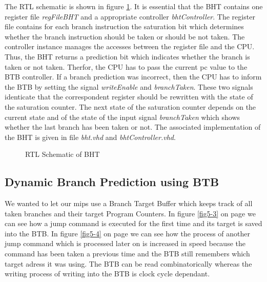 \newpage
The RTL schematic is shown in figure \ref{fig:rtlBHT}. It is essential that the BHT contains one register file \textit{regFileBHT} and a appropriate controller \textit{bhtController}. The register file contains for each branch instruction the saturation bit which determines whether the branch instruction should be taken or should be not taken. The controller instance manages the accesses between the register file and the CPU. Thus, the BHT returns a prediction bit which indicates whether the branch is taken or not taken. Therfor, the CPU has to pass the current pc value to the BTB controller. If a branch prediction was incorrect, then the CPU has to inform the BTB by setting the signal \textit{writeEnable} and \textit{branchTaken}. These two signals identicate that the correspondent register should be rewritten with the state of the saturation counter. The next state of the saturation counter depends on the current state and of the state of the input signal \textit{branchTaken} which shows whether the last branch has been taken or not. The associated implementation of the BHT is given in file \textit{bht.vhd} and \textit{bhtController.vhd}.
\begin{figure}[h!]
\begin{minipage}{0.4\textwidth} 
	\centering
	\caption{RTL Schematic of BHT}
	\label{fig:rtlBHT}
   	
\end{minipage}
\end{figure}
\newpage


\subsection{Dynamic Branch Prediction using BTB}
We wanted to let our mips use a Branch Target Buffer which keeps track of all taken branches and their target Program Counters. In figure \ref{fig5-3} on page \pageref{fig5-3} we can see how a jump command is executed for the first time and its target is saved into the BTB. In figure \ref{fig5-4} on page \pageref{fig5-4} we can see how the process of another jump command which is processed later on is increased in speed because the command has been taken a previous time and the BTB still remembers which target adress it was using. The BTB can be read combinatorically whereas the writing process of writing into the BTB is clock cycle dependant.

